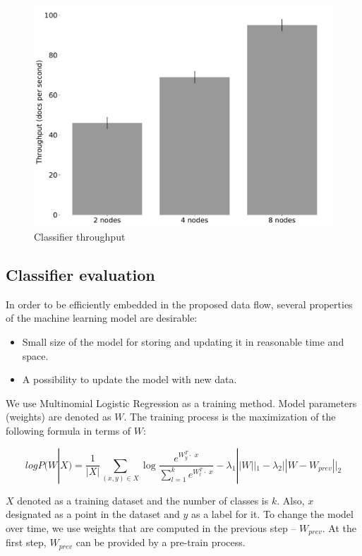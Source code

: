 \begin{figure}[htbp]
  \centering
  \includegraphics[scale=0.25]{pics/classifier_throughput}
  \caption{Classifier throughput}
  \label {throughput}
\end{figure}

\subsection{Classifier evaluation}

In order to be efficiently embedded in the proposed data flow, several properties of the machine learning model are desirable:
\begin{itemize}
     \item Small size of the model for storing and updating it in reasonable time and space.
     \item A possibility to update the model with new data.
\end{itemize}

We use Multinomial Logistic Regression as a training method. Model parameters (weights) are denoted as $W$. The training process is the maximization of the following formula in terms of $W$:

$$ logP(W | X) = \frac{1}{|X|} \sum \limits_{(x, y) \in X} \log \frac{e^{{W_y^T \cdot \; x}}}{\sum \limits_{l = 1}^{k}  e^{{W_{l}^T \cdot \; x}}} - \lambda_1 ||W||_1 - \lambda_2 ||W - W_{prev}||_2 $$ 

$X$ denoted as a training dataset and the number of classes is $k$. Also, $x$ designated as a point in the dataset and $y$ as a label for it. To change the model over time, we use weights that are computed in the previous step -- $W_{prev}$. At the first step, $W_{prev}$ can be provided by a pre-train process.

